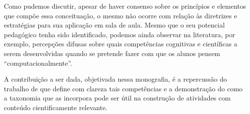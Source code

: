 Como pudemos discutir, apesar de haver consenso sobre os princípios e elementos que compõe essa conceituação, o mesmo não ocorre com relação às diretrizes e estratégias para sua aplicação em sala de aula. Mesmo que o seu potencial pedagógico tenha sido identificado, podemos ainda observar na literatura, por exemplo, percepções difusas sobre quais competências cognitivas e científicas a serem desenvolvidas quando se pretende fazer com que os alunos pensem ``computacionalmente''. 

A contribuição a ser dada, objetivada nessa monografia, é a repercussão do trabalho de  que define com clareza tais competências e a demonstração do como a taxonomia que as incorpora pode ser útil na construção de atividades com conteúdo cientificamente relevante.



















